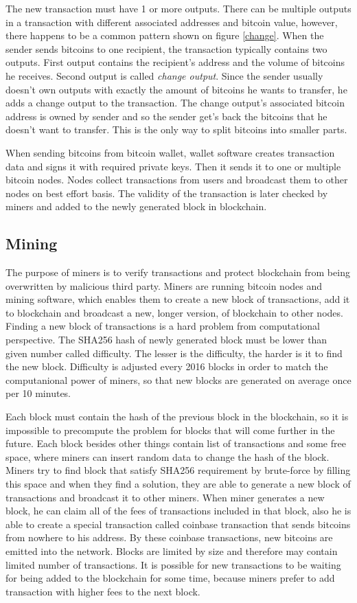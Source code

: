 \documentclass[
  digital, %
  table,   %
  lof,     %
  lot,     %
  oneside
]{fithesis3}
\begin{document}
The new transaction must have 1 or more outputs.
There can be multiple outputs in a transaction with different associated addresses and bitcoin value,
however, there happens to be a common pattern shown on figure \ref{change}. When the sender sends bitcoins to one recipient,
the transaction typically contains two outputs.
First output contains the recipient's address and the volume of bitcoins he receives.
Second output is called \emph{change output}.
Since the sender usually doesn't own outputs with exactly the amount of bitcoins
he wants to transfer, he adds a change output to the transaction.
The change output's associated bitcoin address is owned by sender
and so the sender get's back the bitcoins that he doesn't want to transfer.
This is the only way to split bitcoins into smaller parts. 

When sending bitcoins from bitcoin wallet,
 wallet software creates transaction data and signs it with required private keys.
 Then it sends it to one or multiple bitcoin nodes.
Nodes collect transactions from users and broadcast them to other nodes on best effort basis.
The validity of the transaction is later checked by miners and added to the newly generated block
in blockchain.

\subsection{Mining}

The purpose of miners is to verify transactions and protect blockchain
from being overwritten by malicious third party.
Miners are running bitcoin nodes and mining software,
which enables them to create a new block of transactions,
add it to blockchain and broadcast a new, longer version, of blockchain to other nodes.
Finding a new block of transactions is a hard problem from computational perspective.
The SHA256 hash of newly generated block must be lower than given number called difficulty.
The lesser is the difficulty, the harder is it to find the new block.
Difficulty is adjusted every 2016 blocks in order to match the computanional power of miners,
so that new blocks are generated on average once per 10 minutes.

Each block must contain the hash of the previous block in the blockchain, so it is impossible
to precompute the problem for blocks that will come further in the future. 
Each block besides other things contain list of transactions and some free space,
where miners can insert random data to change the hash of the block.
Miners try to find block that satisfy SHA256 requirement
by brute-force by filling this space and when they find a solution,
they are able to generate a new block of transactions and broadcast it to other miners.
When miner generates a new block, he can claim all of the fees of transactions included in that block,
also he is able to create a special transaction called coinbase transaction that sends bitcoins from
nowhere to his address. By these coinbase transactions, new bitcoins are emitted into the network.
Blocks are limited by size and therefore may contain limited number of transactions.
It is possible for new transactions to be waiting for being added to the blockchain for some time,
because miners prefer to add transaction with higher fees to the next block.
\end{document}
